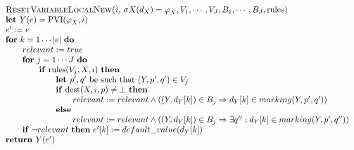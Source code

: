 \begin{equation*}
\begin{tabular}{l}
\textsc{ResetVariableLocalNew(}$i,$ $\sigma X(d_{X})=\varphi
_{X},V_{1},\cdots ,V_{J},B_{1},\cdots ,B_{J},\mathrm{rules}$\textsc{)} \\ 
\textbf{let }$Y(e)=\mathrm{PVI}(\varphi _{X},i)$ \\ 
$e^{\prime }:=e$ \\ 
\textbf{for} $k=1\cdots \left\vert e\right\vert $ \textbf{do} \\ 
$\qquad relevant:=true$ \\ 
$\qquad $\textbf{for} $j=1\cdots J$ \textbf{do} \\ 
$\qquad \qquad $\textbf{if} $\mathrm{rules}(V_{j},X,i)$ \textbf{then} \\ 
$\qquad \qquad \qquad $\textbf{let }$p^{\prime },q^{\prime }$ be such that $%
(Y,p^{\prime },q^{\prime })\in V_{j}$ \\ 
$\qquad \qquad \qquad $\textbf{if} $\mathrm{dest}(X,i,p)\neq \bot $ \textbf{%
then} \\ 
$\qquad \qquad \qquad \qquad relevant:=relevant\wedge \left( \left(
Y,d_{Y}[k]\right) \in B_{j}\Rightarrow d_{Y}[k]\in marking(Y,p^{\prime
},q^{\prime })\right) $ \\ 
$\qquad \qquad \qquad $\textbf{else} \\ 
$\qquad \qquad \qquad \qquad relevant:=relevant\wedge (\left(
Y,d_{Y}[k]\right) \in B_{j}\Rightarrow \exists q^{\prime \prime
}:d_{Y}[k]\in marking(Y,p^{\prime },q^{\prime \prime }))$ \\ 
$\qquad $\textbf{if} $\lnot relevant$ \textbf{then} $e^{\prime
}[k]:=default\_value(d_{Y}[k])$ \\ 
\textbf{return }$Y(e^{\prime })$%
\end{tabular}%
\end{equation*}%
\newpage 
